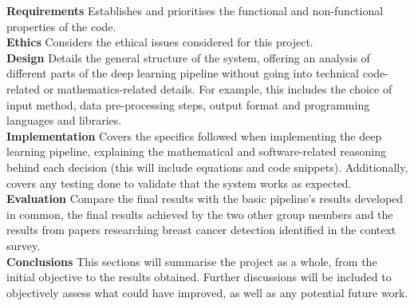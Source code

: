 \textbf{Requirements} \space
Establishes and prioritises the functional and non-functional properties of the code.\\

\textbf{Ethics} \space
Considers the ethical issues considered for this project.\\

\textbf{Design} \space
Details the general structure of the system, offering an analysis of different parts of the deep learning pipeline without going into technical code-related or mathematics-related details. For example, this includes the choice of input method, data pre-processing steps, output format and programming languages and libraries.\\

\textbf{Implementation} \space
Covers the specifics followed when implementing the deep learning pipeline, explaining the mathematical and software-related reasoning behind each decision (this will include equations and code snippets). Additionally, covers any testing done to validate that the system works as expected.\\

\textbf{Evaluation} \space
Compare the final results with the basic pipeline’s results developed in common, the final results achieved by the two other group members and the results from papers researching breast cancer detection identiﬁed in the context survey.\\

\textbf{Conclusions} \space
This sections will summarise the project as a whole, from the initial objective to the results obtained. Further discussions will be included to objectively assess what could have improved, as well as any potential future work.